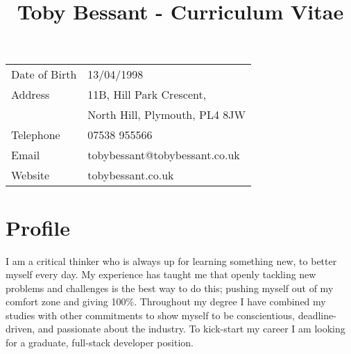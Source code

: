 \documentclass[1pt]{article}
\title{\bfseries\Huge Toby Bessant - Curriculum Vitae\vspace{-1.5em}}
\date{}
\begin{document}
\maketitle
\thispagestyle{fancy}
\begin{center}
\begin{tabular}[]{ll}
Date of Birth & 13/04/1998\\
Address        & 11B, Hill Park Crescent,\\ & North Hill, Plymouth, PL4 8JW \\ 
Telephone     &07538 955566\\
Email            & tobybessant@tobybessant.co.uk\\
Website        & tobybessant.co.uk\\
\end{tabular}
\end{center}
 
\section*{Profile}
I am a critical thinker who is always up for learning something new, to better myself every day. My experience has taught me that openly tackling new problems 
and challenges is the best way to do this; pushing myself out of my comfort zone and giving 100\%. Throughout my degree I have combined my studies with 
other commitments to show myself to be conscientious, deadline-driven, and passionate about the industry. To kick-start my career I am looking for a graduate, 
full-stack developer position.
 
\end{document}
